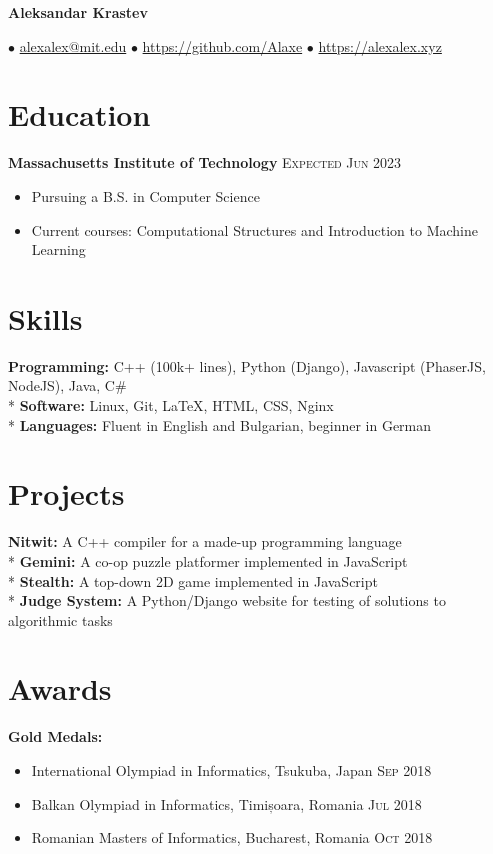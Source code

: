 \documentclass[letterpaper,11pt]{article}
\author{Aleksandar Krastev}
\date{2019-09-03}
\newcommand{\noskip}{\vspace{-\parskip}}
\begin{document}
\centerline{{\Huge \bf Aleksandar Krastev}}
$\bullet$ \href{mailto:alexalex@mit.edu}{alexalex@mit.edu} \hfill
$\bullet$ \href{https://github.com/Alaxe}{https://github.com/Alaxe} \hfill
$\bullet$ \href{https://alexalex.xyz}{https://alexalex.xyz}

\noskip
\section*{Education}
\textbf{Massachusetts Institute of Technology}
\hfill
\textsc{Expected Jun 2023}

\noskip
\begin{itemize}
    \item Pursuing a B.S. in Computer Science
    \item Current courses: Computational Structures and Introduction to Machine
        Learning
\end{itemize}

\section*{Skills}
\textbf{Programming:} C++ (100k+ lines), Python (Django), Javascript
    (PhaserJS, NodeJS), Java, C\#\\*
\textbf{Software:} Linux, Git, LaTeX, HTML, CSS, Nginx\\*
\textbf{Languages:} Fluent in English and Bulgarian, beginner in German

\section*{Projects}
\textbf{Nitwit:} A C++ compiler for a made-up programming language\\*
\textbf{Gemini:} A co-op puzzle platformer implemented in JavaScript\\*
\textbf{Stealth:} A top-down 2D game implemented in JavaScript\\*
\textbf{Judge System:} A Python/Django website for testing of solutions
to algorithmic tasks

\section*{Awards}
\textbf{Gold Medals:}
\noskip
\begin{itemize}
    \item International Olympiad in Informatics, Tsukuba, Japan
        \hfill \textsc{Sep 2018}
    \item Balkan Olympiad in Informatics, Timișoara, Romania
        \hfill \textsc{Jul 2018}
    \item Romanian Masters of Informatics, Bucharest, Romania
        \hfill \textsc{Oct 2018}
\end{itemize}
\end{document}

